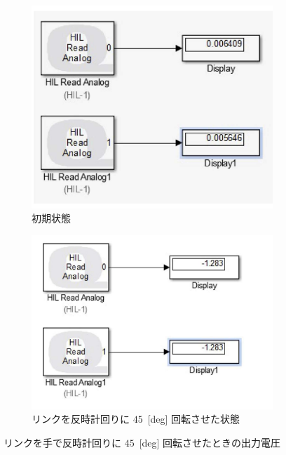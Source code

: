 \begin{figure}[htbp]
    \centering
    \begin{subfigure}[b]{0.45\linewidth}
        \centering
        \includegraphics[width=\linewidth]{figure/voltage_before.pdf}
        \caption{初期状態}
        \label{fig:voltage_0V}
    \end{subfigure}
    \hfill
    \begin{subfigure}[b]{0.45\linewidth}
        \centering
        \includegraphics[width=\linewidth]{figure/voltage_after.pdf}
        \caption{リンクを反時計回りに $45$~[deg] 回転させた状態}
        \label{fig:voltage_-1.2857V}
    \end{subfigure}
    \caption{リンクを手で反時計回りに $45$~[deg] 回転させたときの出力電圧}
    \label{fig:output_voltage_change}
\end{figure}

